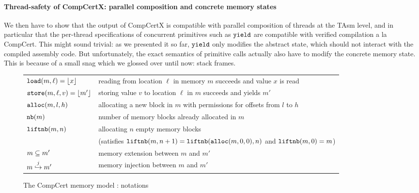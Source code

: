 \paragraph{Thread-safety of CompCertX: parallel composition and concrete memory states}

We then have to show that the output of CompCertX is compatible with
parallel composition of threads at the TAsm level, and in particular
that the per-thread specifications of concurrent primitives such as
$\yield$ are compatible with verified compilation a la CompCert.  This
might sound trivial: as we presented it so far, $\yield$ only modifies
the abstract state, which should not interact with the compiled
assembly code. But unfortunately, the exact semantics of primitive
calls actually also have to modify the concrete memory state. This is because
of a small snag which we glossed over until now: stack frames.


\begin{figure}
\begin{small}
\begin{tabular}{ll}
$\load{m}{\ell} = \some{x}$ & reading from location $\ell$ in memory $m$ succeeds and value $x$ is read \\
$\store{m}{\ell}{v} = \some{m'}$ & storing value $v$ to location $\ell$ in  $m$ succeeds and yields $m'$ \\
$\alloc{m}{l}{h}$ & allocating a new block in $m$ with permissions for offsets from $l$ to $h$ \\
$\nextblock{m}$ & number of memory blocks already allocated in $m$ \\
$\liftnextblock{m}{n}$ & allocating $n$ empty memory blocks \\
&(satisfies $\liftnextblock{m}{n+1} = \liftnextblock{\alloc{m}{0}{0}}{n}$ and $\liftnextblock{m}{0} = m$) \\
$\extends{m}{m'}$ & memory extension between $m$ and $m'$ \cite[\S 5.2]{leroy08} \\
$\inject{j}{m}{m'}$ & memory injection between $m$ and $m'$ \cite[\S 5.4]{leroy08} \\
\end{tabular}
\end{small}
\caption{The CompCert memory model \cite{leroy08}: notations} \label{fig:mem}
\hrulefill
\end{figure}

